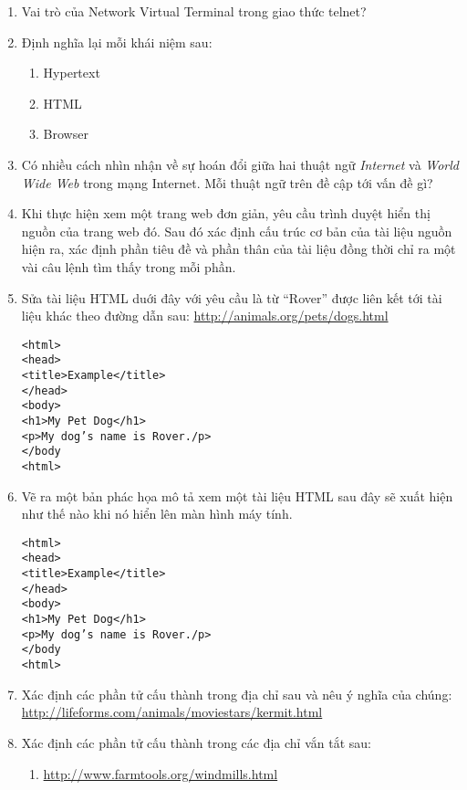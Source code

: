 \begin{multicols}{2}
\begin{enumerate}
  \item Vai trò của Network Virtual Terminal trong giao thức telnet?

  \item Định nghĩa lại mỗi khái niệm sau:
    \begin{enumerate}
    \item Hypertext
    \item HTML
    \item Browser
    \end{enumerate}


  \item Có nhiều cách nhìn nhận về sự hoán đổi giữa hai thuật ngữ \textit{Internet} và
    \textit{World Wide Web} trong mạng Internet. Mỗi thuật ngữ trên đề cập tới vấn đề gì?

  \item Khi thực hiện xem một trang web đơn giản, yêu cầu trình duyệt hiển thị nguồn của
    trang web đó. Sau đó xác định cấu trúc cơ bản của tài liệu nguồn hiện ra, xác định
    phần tiêu đề và phần thân của tài liệu đồng thời chỉ ra một vài câu lệnh tìm thấy
    trong mỗi phần.


  \item Sửa tài liệu HTML duới đây với yêu cầu là từ ``Rover'' được liên kết tới tài liệu
    khác theo đường dẫn sau: \url{http://animals.org/pets/dogs.html}
\begin{verbatim}
<html>
<head>
<title>Example</title>
</head>
<body>
<h1>My Pet Dog</h1>
<p>My dog’s name is Rover./p>
</body
<html>
\end{verbatim}

  \item Vẽ ra một bản phác họa mô tả xem một tài liệu HTML sau đây sẽ xuất hiện như thế
    nào khi nó hiển lên màn hình máy tính.
\begin{verbatim}
<html>
<head>
<title>Example</title>
</head>
<body>
<h1>My Pet Dog</h1>
<p>My dog’s name is Rover./p>
</body
<html>
\end{verbatim}

  \item Xác định các phần tử cấu thành trong địa chỉ sau và nêu ý nghĩa của chúng:\\
    \url{http://lifeforms.com/animals/moviestars/kermit.html}

  \item Xác định các phần tử cấu thành trong các địa chỉ vắn tắt sau:

    \begin{enumerate}
    \item \url{http://www.farmtools.org/windmills.html} 


\end{enumerate}
\end{enumerate}
\end{multicols}
